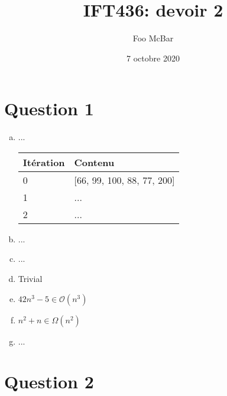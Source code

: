 \documentclass{article}
\title{IFT436: devoir 2}
\author{Foo McBar}
\date{7 octobre 2020}
\renewcommand{\O}{\mathcal{O}}
\begin{document}
\maketitle

\section*{Question 1}

\begin{enumerate}[(a)]

\item ...

  \begin{center}
    \begin{tabular}{l|l}
      \textbf{Itération} & \textbf{Contenu} \\

      \hline
      0 & [66, 99, 100, 88, 77, 200] \\

      \hline
      1 & ... \\

      \hline
      2 & ... \\
      
    \end{tabular}
  \end{center}

\item ...

\item ...

\item Trivial

\item $42n^3 - 5 \in \O(n^3)$

\item $n^2 + n \in \Omega(n^2)$

\item ...

\end{enumerate}

\section*{Question 2}
\end{document}
